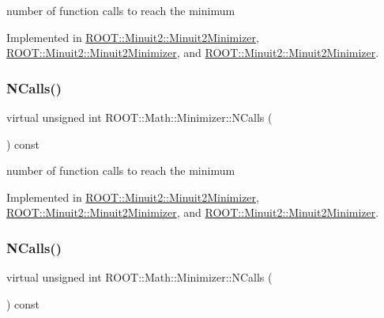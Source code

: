 number of function calls to reach the minimum 



Implemented in \mbox{\hyperlink{classROOT_1_1Minuit2_1_1Minuit2Minimizer_ab5faf7c3dc0b3743eee8352c62a6ccfd}{R\+O\+O\+T\+::\+Minuit2\+::\+Minuit2\+Minimizer}}, \mbox{\hyperlink{classROOT_1_1Minuit2_1_1Minuit2Minimizer_ab5faf7c3dc0b3743eee8352c62a6ccfd}{R\+O\+O\+T\+::\+Minuit2\+::\+Minuit2\+Minimizer}}, and \mbox{\hyperlink{classROOT_1_1Minuit2_1_1Minuit2Minimizer_ab5faf7c3dc0b3743eee8352c62a6ccfd}{R\+O\+O\+T\+::\+Minuit2\+::\+Minuit2\+Minimizer}}.

\mbox{\label{classROOT_1_1Math_1_1Minimizer_abf8b2e97d47843a1fde7a54cb51c1f0e}} 
\subsubsection{\texorpdfstring{NCalls()}{NCalls()}\hspace{0.1cm}{\footnotesize\ttfamily [2/3]}}
{\footnotesize\ttfamily virtual unsigned int R\+O\+O\+T\+::\+Math\+::\+Minimizer\+::\+N\+Calls (\begin{DoxyParamCaption}{ }\end{DoxyParamCaption}) const\hspace{0.3cm}{\ttfamily [pure virtual]}}



number of function calls to reach the minimum 



Implemented in \mbox{\hyperlink{classROOT_1_1Minuit2_1_1Minuit2Minimizer_ab5faf7c3dc0b3743eee8352c62a6ccfd}{R\+O\+O\+T\+::\+Minuit2\+::\+Minuit2\+Minimizer}}, \mbox{\hyperlink{classROOT_1_1Minuit2_1_1Minuit2Minimizer_ab5faf7c3dc0b3743eee8352c62a6ccfd}{R\+O\+O\+T\+::\+Minuit2\+::\+Minuit2\+Minimizer}}, and \mbox{\hyperlink{classROOT_1_1Minuit2_1_1Minuit2Minimizer_ab5faf7c3dc0b3743eee8352c62a6ccfd}{R\+O\+O\+T\+::\+Minuit2\+::\+Minuit2\+Minimizer}}.

\mbox{\label{classROOT_1_1Math_1_1Minimizer_abf8b2e97d47843a1fde7a54cb51c1f0e}} 
\subsubsection{\texorpdfstring{NCalls()}{NCalls()}\hspace{0.1cm}{\footnotesize\ttfamily [3/3]}}
{\footnotesize\ttfamily virtual unsigned int R\+O\+O\+T\+::\+Math\+::\+Minimizer\+::\+N\+Calls (\begin{DoxyParamCaption}{ }\end{DoxyParamCaption}) const\hspace{0.3cm}{\ttfamily [pure virtual]}}



